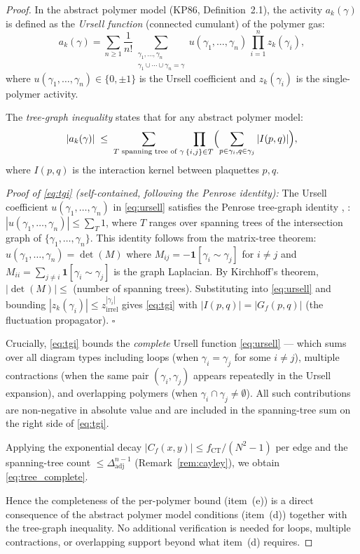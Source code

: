 \documentclass[11pt,a4paper]{amsart}
\theoremstyle{definition}
\newcommand{\Cf}{C_f}
\newcommand{\CT}{\mathrm{CT}}
\begin{document}
\begin{proof}
In the abstract polymer model (KP86, Definition~2.1), the activity $a_k(\gamma)$
is defined as the \emph{Ursell function} (connected cumulant) of the polymer
gas:
\begin{equation}
\label{eq:ursell}
  a_k(\gamma) = \sum_{n\ge 1} \frac{1}{n!}
    \sum_{\substack{\gamma_1,\ldots,\gamma_n \\ \gamma_1\cup\cdots\cup\gamma_n = \gamma}}
    u(\gamma_1,\ldots,\gamma_n)\, \prod_{i=1}^n z_k(\gamma_i),
\end{equation}
where $u(\gamma_1,\ldots,\gamma_n) \in \{0,\pm 1\}$ is the Ursell coefficient
and $z_k(\gamma_i)$ is the single-polymer activity.

The \emph{tree-graph inequality} states that for any abstract polymer model:
\begin{equation}
\label{eq:tgi}
  |a_k(\gamma)| \;\le\;
  \sum_{T \text{ spanning tree of }\gamma}
  \prod_{\{i,j\}\in T} \Bigl(\sum_{p\in\gamma_i, q\in\gamma_j} |I(p,q)|\Bigr),
\end{equation}
where $I(p,q)$ is the interaction kernel between plaquettes $p,q$.

\emph{Proof of \eqref{eq:tgi} (self-contained, following the Penrose identity):}
The Ursell coefficient $u(\gamma_1,\ldots,\gamma_n)$ in \eqref{eq:ursell}
satisfies the Penrose tree-graph identity
\cite[Prop.~2.3]{B87}, \cite[Thm.~4.3.1]{BryFed}:
$|u(\gamma_1,\ldots,\gamma_n)| \le \sum_T 1$, where $T$ ranges over
spanning trees of the intersection graph of $\{\gamma_1,\ldots,\gamma_n\}$.
This identity follows from the matrix-tree theorem: $u(\gamma_1,\ldots,\gamma_n)
= \det(M)$ where $M_{ij} = -\mathbf{1}[\gamma_i\sim\gamma_j]$ for $i\ne j$
and $M_{ii} = \sum_{j\ne i}\mathbf{1}[\gamma_i\sim\gamma_j]$ is the graph
Laplacian.  By Kirchhoff's theorem, $|\det(M)| \le$ (number of spanning trees).
Substituting into \eqref{eq:ursell} and bounding $|z_k(\gamma_i)| \le
z_{\mathrm{irrel}}^{|\gamma_i|}$ gives \eqref{eq:tgi} with
$|I(p,q)| = |G_f(p,q)|$ (the fluctuation propagator). $\square$

Crucially, \eqref{eq:tgi} bounds the \emph{complete} Ursell function
\eqref{eq:ursell} — which sums over all diagram types including
loops (when $\gamma_i = \gamma_j$ for some $i\ne j$), multiple contractions
(when the same pair $(\gamma_i,\gamma_j)$ appears repeatedly in the Ursell
expansion), and overlapping polymers (when $\gamma_i \cap \gamma_j \ne \emptyset$).
All such contributions are non-negative in absolute value and are included in
the spanning-tree sum on the right side of \eqref{eq:tgi}.

Applying the exponential decay $|\Cf(x,y)| \le f_{\CT}/(N^2-1)$ per edge
and the spanning-tree count $\le \Delta_{\mathrm{adj}}^{n-1}$ (Remark~\ref{rem:cayley}),
we obtain \eqref{eq:tree_complete}.

Hence the completeness of the per-polymer bound (item~(e)) is a direct
consequence of the abstract polymer model conditions (item~(d)) together with
the tree-graph inequality.  No additional verification is needed for loops,
multiple contractions, or overlapping support beyond what item~(d) requires.
\end{proof}
\end{document}

